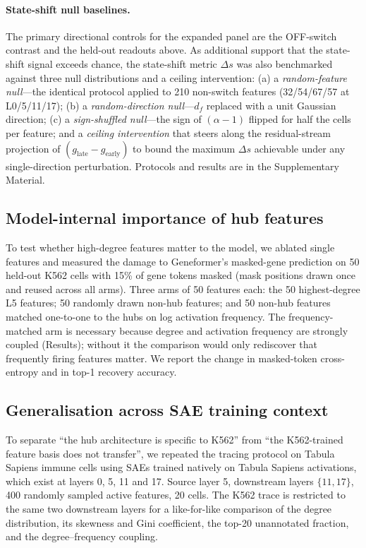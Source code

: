 \documentclass[11pt,onecolumn]{article}
\begin{document}
\paragraph{State-shift null baselines.}
The primary directional controls for the expanded panel are the OFF-switch contrast and the held-out readouts above. As additional support that the state-shift signal exceeds chance, the state-shift metric $\Delta s$ was also benchmarked against three null distributions and a ceiling intervention: (a) a \emph{random-feature null}---the identical protocol applied to 210 non-switch features (32/54/67/57 at L0/5/11/17); (b) a \emph{random-direction null}---$d_f$ replaced with a unit Gaussian direction; (c) a \emph{sign-shuffled null}---the sign of $(\alpha-1)$ flipped for half the cells per feature; and a \emph{ceiling intervention} that steers along the residual-stream projection of $(g_\text{late}-g_\text{early})$ to bound the maximum $\Delta s$ achievable under any single-direction perturbation. Protocols and results are in the Supplementary Material.

\subsection{Model-internal importance of hub features}

To test whether high-degree features matter to the model, we ablated single features and measured the damage to Geneformer's masked-gene prediction on 50 held-out K562 cells with 15\% of gene tokens masked (mask positions drawn once and reused across all arms). Three arms of 50 features each: the 50 highest-degree L5 features; 50 randomly drawn non-hub features; and 50 non-hub features matched one-to-one to the hubs on log activation frequency. The frequency-matched arm is necessary because degree and activation frequency are strongly coupled (Results); without it the comparison would only rediscover that frequently firing features matter. We report the change in masked-token cross-entropy and in top-1 recovery accuracy.

\subsection{Generalisation across SAE training context}

To separate ``the hub architecture is specific to K562'' from ``the K562-trained feature basis does not transfer'', we repeated the tracing protocol on Tabula Sapiens immune cells using SAEs trained natively on Tabula Sapiens activations, which exist at layers 0, 5, 11 and 17. Source layer 5, downstream layers $\{11, 17\}$, 400 randomly sampled active features, 20 cells. The K562 trace is restricted to the same two downstream layers for a like-for-like comparison of the degree distribution, its skewness and Gini coefficient, the top-20 unannotated fraction, and the degree--frequency coupling.
\end{document}
